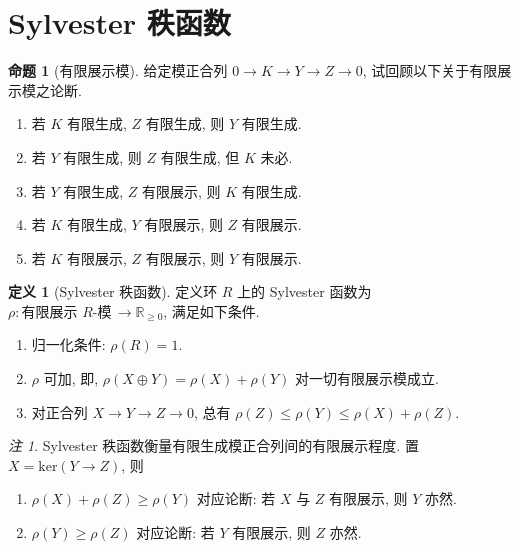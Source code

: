 \documentclass{MainStyle}
\theoremstyle{definition}
\theoremstyle{definition}
\theoremstyle{definition}
\newtheorem{definition}{定义}
\theoremstyle{definition}
\newtheorem{proposition}{命题}
\theoremstyle{definition}
\theoremstyle{definition}
\theoremstyle{definition}
\theoremstyle{remark}
\newtheorem{remark}{注}
\theoremstyle{remark}
\begin{document}
\maketitle

\section{Sylvester 秩函数}

\begin{proposition}[有限展示模]
    给定模正合列 $0\to K\to Y\to Z\to 0$, 试回顾以下关于有限展示模之论断.
    \begin{enumerate}
        \item 若 $K$ 有限生成, $Z$ 有限生成, 则 $Y$ 有限生成.
        \item[1'.] 若 $Y$ 有限生成, 则 $Z$ 有限生成, 但 $K$ 未必.
        \item 若 $Y$ 有限生成, $Z$ 有限展示, 则 $K$ 有限生成.
        \item 若 $K$ 有限生成, $Y$ 有限展示, 则 $Z$ 有限展示.
        \item 若 $K$ 有限展示, $Z$ 有限展示, 则 $Y$ 有限展示.
    \end{enumerate}
\end{proposition}

\begin{definition}[Sylvester 秩函数]
    定义环 $R$ 上的 Sylvester 函数为 $\rho: \text{有限展示 $R$-模}\,\to \mathbb R_{\geq 0}$, 满足如下条件.
    \begin{enumerate}
        \item 归一化条件: $\rho(R)=1$.
        \item $\rho$ 可加, 即, $\rho(X\oplus Y)=\rho(X)+\rho(Y)$ 对一切有限展示模成立.
        \item 对正合列 $X\to Y\to Z\to 0$, 总有 $\rho(Z)\leq \rho(Y)\leq \rho(X)+\rho(Z)$.
    \end{enumerate}
\end{definition}

\begin{remark}
    Sylvester 秩函数衡量有限生成模正合列间的有限展示程度. 置 $X=\mathrm{ker}(Y\to Z)$, 则
    \begin{enumerate}
        \item $\rho(X)+\rho(Z)\geq \rho(Y)$ 对应论断: 若 $X$ 与 $Z$ 有限展示, 则 $Y$ 亦然.
        \item $\rho(Y)\geq\rho(Z)$ 对应论断: 若 $Y$ 有限展示, 则 $Z$ 亦然.
    \end{enumerate}
\end{remark}
\end{document}

